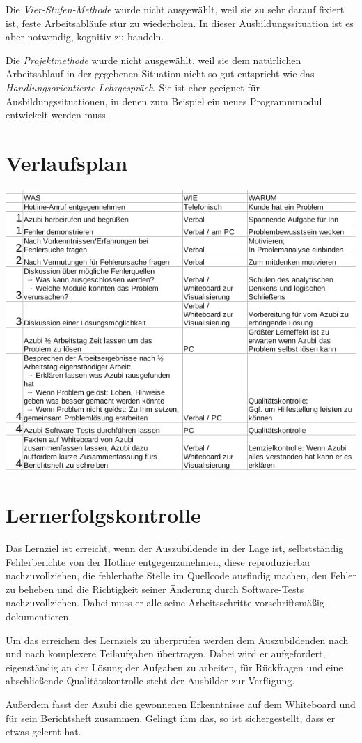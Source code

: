 \documentclass[11pt,a4paper,notitlepage,ngerman]{article}
\begin{document}
Die \emph{Vier-Stufen-Methode} wurde nicht ausgewählt, weil sie zu sehr darauf
fixiert ist, feste Arbeitsabläufe stur zu wiederholen. In dieser Ausbildungssituation
ist es aber notwendig, kognitiv zu handeln.

Die \emph{Projektmethode} wurde nicht ausgewählt, weil sie dem natürlichen
Arbeitsablauf in der gegebenen Situation nicht so gut entspricht wie das
\emph{Handlungsorientierte Lehrgespräch}. Sie ist eher geeignet für
Ausbildungssituationen, in denen zum Beispiel ein neues Programmmodul entwickelt
werden muss.

\section{Verlaufsplan}

\includegraphics[scale=0.6]{pic/verlaufsplan.png}

\section{Lernerfolgskontrolle}

Das Lernziel ist erreicht, wenn der Auszubildende in der Lage ist, selbstständig
Fehlerberichte von der Hotline entgegenzunehmen, diese reproduzierbar nachzuvollziehen,
die fehlerhafte Stelle im Quellcode ausfindig machen, den Fehler zu beheben und
die Richtigkeit seiner Änderung durch Software-Tests nachzuvollziehen.
Dabei muss er alle seine Arbeitsschritte vorschriftsmäßig dokumentieren.

Um das erreichen des Lernziels zu überprüfen werden dem Auszubildenden nach
und nach komplexere Teilaufgaben übertragen. Dabei wird er aufgefordert,
eigenständig an der Lösung der Aufgaben zu arbeiten, für Rückfragen und eine
abschließende Qualitätskontrolle steht der Ausbilder zur Verfügung.

Außerdem fasst der Azubi die gewonnenen Erkenntnisse auf dem Whiteboard und
für sein Berichtsheft zusammen. Gelingt ihm das, so ist sichergestellt,
dass er etwas gelernt hat.
\end{document}
